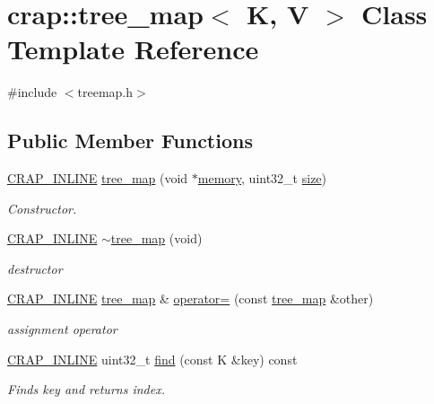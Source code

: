 \hypertarget{classcrap_1_1tree__map}{}\section{crap\+:\+:tree\+\_\+map$<$ K, V $>$ Class Template Reference}
\label{classcrap_1_1tree__map}


{\ttfamily \#include $<$treemap.\+h$>$}

\subsection*{Public Member Functions}
\begin{DoxyCompactItemize}
\item 
\hyperlink{config__x86_8h_a5a40526b8d842e7ff731509998bb0f1c}{C\+R\+A\+P\+\_\+\+I\+N\+L\+I\+N\+E} \hyperlink{classcrap_1_1tree__map_a6a4a68fa3fb61c3d9d97e1575a638736}{tree\+\_\+map} (void $\ast$\hyperlink{classcrap_1_1tree__map_a478da4a9798b325ef27494a2c9a178f4}{memory}, uint32\+\_\+t \hyperlink{classcrap_1_1tree__map_a8f64f41ca15631a937cbca9c8e6fdcec}{size})
\begin{DoxyCompactList}\small\item\em Constructor. \end{DoxyCompactList}\item 
\hyperlink{config__x86_8h_a5a40526b8d842e7ff731509998bb0f1c}{C\+R\+A\+P\+\_\+\+I\+N\+L\+I\+N\+E} \hyperlink{classcrap_1_1tree__map_a0b2a381e1a3627fdb4394d795162f50b}{$\sim$tree\+\_\+map} (void)
\begin{DoxyCompactList}\small\item\em destructor \end{DoxyCompactList}\item 
\hyperlink{config__x86_8h_a5a40526b8d842e7ff731509998bb0f1c}{C\+R\+A\+P\+\_\+\+I\+N\+L\+I\+N\+E} \hyperlink{classcrap_1_1tree__map}{tree\+\_\+map} \& \hyperlink{classcrap_1_1tree__map_aeb66fdfeccd5d8a847ae6181e9d2b408}{operator=} (const \hyperlink{classcrap_1_1tree__map}{tree\+\_\+map} \&other)
\begin{DoxyCompactList}\small\item\em assignment operator \end{DoxyCompactList}\item 
\hyperlink{config__x86_8h_a5a40526b8d842e7ff731509998bb0f1c}{C\+R\+A\+P\+\_\+\+I\+N\+L\+I\+N\+E} uint32\+\_\+t \hyperlink{classcrap_1_1tree__map_a46b641ad05589465628201f999153638}{find} (const K \&key) const 
\begin{DoxyCompactList}\small\item\em Finds key and returns index. \end{DoxyCompactList}\item 

\end{DoxyCompactItemize}
